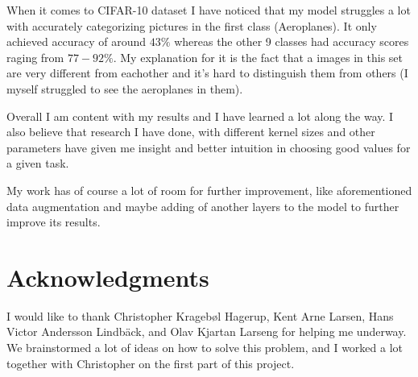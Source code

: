 \documentclass[conference]{IEEEtran}
\begin{document}
When it comes to CIFAR-10 dataset I have noticed that my model struggles a lot with accurately categorizing pictures in the first class (Aeroplanes). It only achieved accuracy of around $43\%$ whereas the other 9 classes had accuracy scores raging from $77-92\%$. My explanation for it is the fact that a images in this set are very different from eachother and it's hard to distinguish them from others (I myself struggled to see the aeroplanes in them).

Overall I am content with my results and I have learned a lot along the way. I also believe that research I have done, with different kernel sizes and other parameters have given me insight and better intuition in choosing good values for a given task.

My work has of course a lot of room for further improvement, like aforementioned data augmentation and maybe adding of another layers to the model to further improve its results.


\section*{Acknowledgments}
I would like to thank Christopher Kragebøl Hagerup, Kent Arne Larsen, Hans Victor Andersson Lindbäck, and Olav Kjartan Larseng for helping me underway. We brainstormed a lot of ideas on how to solve this problem, and I worked a lot together with Christopher on the first part of this project.



\end{document}
